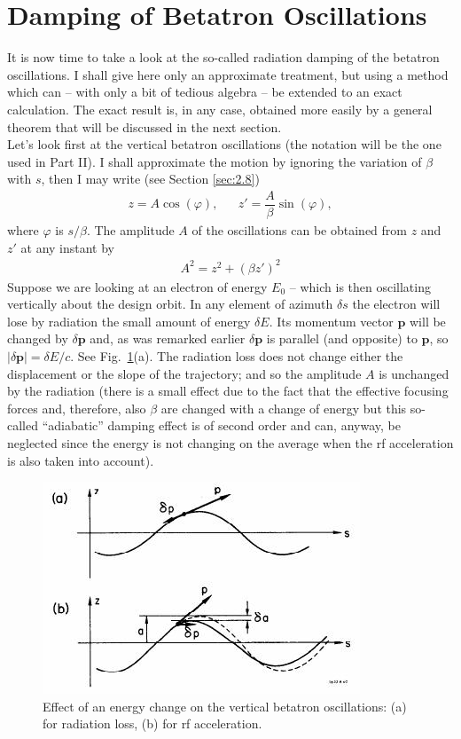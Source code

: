 \section{Damping of Betatron Oscillations}\label{sec:4.3}
It is now time to take a look at the so-called radiation damping of the betatron oscillations. I shall give here only an approximate treatment, but using a method which can -- with only a bit of tedious algebra -- be extended to an exact calculation. The exact result is, in any case, obtained more easily by a general theorem that will be discussed in the next section.\\
Let's look first at the vertical betatron oscillations (the notation will be the one used in Part II). I shall approximate the motion by ignoring the variation of $\beta$ with $s$, then I may write (see Section \ref{sec:2.8})
\begin{align}
	z = A \cos(\varphi), && z' = \dfrac{A}{\beta}\sin(\varphi),
\end{align}
where $\varphi$ is $s/\beta$. The amplitude $A$ of the oscillations can be obtained from $z$ and
$z'$ at any instant by
\begin{align}
	A^2 = z^2 + (\beta z')^2
\end{align}
Suppose we are looking at an electron of energy $E_0$ -- which is then oscillating vertically
 about the design orbit. In any element of azimuth $\delta s$ the electron will lose by radiation
 the small amount of energy $\delta E$. Its momentum vector $\bm{p}$ will be changed by $\delta \bm{p}$ and, as was remarked earlier $\delta \bm{p}$ is parallel (and opposite) to $\bm{p}$, so $|\delta \bm{p}| = \delta E/c$. See Fig.~\ref{fig:fig40}(a). The radiation loss does not change either the displacement or the slope of the trajectory; and so the amplitude $A$ is unchanged
by the radiation (there is a small effect due to the fact that the effective focusing forces and, therefore, also $\beta$ are changed with a change of energy but this so-called ``adiabatic'' damping effect is of second order and can, anyway, be neglected since the energy is not changing on the average when the rf acceleration is also taken into account).

\begin{figure}[!htb]
	\centering
	\includegraphics[width=0.8\linewidth]{./Figuras/fig40.jpeg}
	\caption{Effect of an energy change on the vertical betatron oscillations: (a) for radiation loss, (b) for rf acceleration.}
	\label{fig:fig40}
\end{figure}

